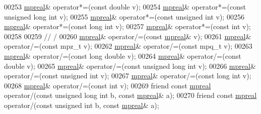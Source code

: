 \begin{DoxyCode}
00253     \hyperlink{classmpfr_1_1mpreal}{mpreal}& operator*=(\textcolor{keyword}{const} \textcolor{keywordtype}{double} v);
00254     \hyperlink{classmpfr_1_1mpreal}{mpreal}& operator*=(\textcolor{keyword}{const} \textcolor{keywordtype}{unsigned} \textcolor{keywordtype}{long} \textcolor{keywordtype}{int} v);
00255     \hyperlink{classmpfr_1_1mpreal}{mpreal}& operator*=(\textcolor{keyword}{const} \textcolor{keywordtype}{unsigned} \textcolor{keywordtype}{int} v);
00256     \hyperlink{classmpfr_1_1mpreal}{mpreal}& operator*=(\textcolor{keyword}{const} \textcolor{keywordtype}{long} \textcolor{keywordtype}{int} v);
00257     \hyperlink{classmpfr_1_1mpreal}{mpreal}& operator*=(\textcolor{keyword}{const} \textcolor{keywordtype}{int} v);
00258 
00259     \textcolor{comment}{// /}
00260     \hyperlink{classmpfr_1_1mpreal}{mpreal}& operator/=(\textcolor{keyword}{const} \hyperlink{classmpfr_1_1mpreal}{mpreal}& v);
00261     \hyperlink{classmpfr_1_1mpreal}{mpreal}& operator/=(\textcolor{keyword}{const} mpz\_t v);
00262     \hyperlink{classmpfr_1_1mpreal}{mpreal}& operator/=(\textcolor{keyword}{const} mpq\_t v);
00263     \hyperlink{classmpfr_1_1mpreal}{mpreal}& operator/=(\textcolor{keyword}{const} \textcolor{keywordtype}{long} \textcolor{keywordtype}{double} v);
00264     \hyperlink{classmpfr_1_1mpreal}{mpreal}& operator/=(\textcolor{keyword}{const} \textcolor{keywordtype}{double} v);
00265     \hyperlink{classmpfr_1_1mpreal}{mpreal}& operator/=(\textcolor{keyword}{const} \textcolor{keywordtype}{unsigned} \textcolor{keywordtype}{long} \textcolor{keywordtype}{int} v);
00266     \hyperlink{classmpfr_1_1mpreal}{mpreal}& operator/=(\textcolor{keyword}{const} \textcolor{keywordtype}{unsigned} \textcolor{keywordtype}{int} v);
00267     \hyperlink{classmpfr_1_1mpreal}{mpreal}& operator/=(\textcolor{keyword}{const} \textcolor{keywordtype}{long} \textcolor{keywordtype}{int} v);
00268     \hyperlink{classmpfr_1_1mpreal}{mpreal}& operator/=(\textcolor{keyword}{const} \textcolor{keywordtype}{int} v);
00269     \textcolor{keyword}{friend} \textcolor{keyword}{const} \hyperlink{classmpfr_1_1mpreal}{mpreal} operator/(\textcolor{keyword}{const} \textcolor{keywordtype}{unsigned} \textcolor{keywordtype}{long} \textcolor{keywordtype}{int} b, \textcolor{keyword}{const} \hyperlink{classmpfr_1_1mpreal}{mpreal}& a);
00270     \textcolor{keyword}{friend} \textcolor{keyword}{const} \hyperlink{classmpfr_1_1mpreal}{mpreal} operator/(\textcolor{keyword}{const} \textcolor{keywordtype}{unsigned} \textcolor{keywordtype}{int} b,      \textcolor{keyword}{const} \hyperlink{classmpfr_1_1mpreal}{mpreal}& a);

\end{DoxyCode}
